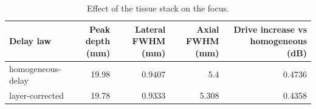 \begin{table}
\caption{Effect of the tissue stack on the focus.}
\label{tab:T_S6_layered}
\begin{tabular}{lrrrr}
\toprule
Delay law & Peak depth (mm) & Lateral FWHM (mm) & Axial FWHM (mm) & Drive increase vs homogeneous (dB) \\
\midrule
homogeneous-delay & 19.98 & 0.9407 & 5.4 & 0.4736 \\
layer-corrected & 19.78 & 0.9333 & 5.308 & 0.4358 \\
\bottomrule
\end{tabular}
\end{table}

